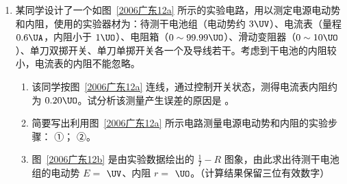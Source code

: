 \documentclass[\gkver]{gaokaozhenti}
\begin{document}
\begin{enumerate}
{figs/11b.png}

\begin{enumerate}
	\item
	实验前应对实验装置反复调节，直到 \tkanswer[3cm]{}。每次让小球从同一位置由静止释放，是为了 \tkanswer[4cm]{}。
	\item
	每次将 B 板向内侧平移距离 $d$，是为了 \tkanswer[5cm]{}。
	\item
	在图~\ref{2006广东11b} 中绘出小球做平抛运动的轨迹。
\end{enumerate}



\item
某同学设计了一个如图~\ref{2006广东12a} 所示的实验电路，用以测定电源电动势和内阻，使用的实验器材为：待测干电池组（电动势约 $3\UV$）、电流表（量程 $0.6\UA$，内阻小于 $1\UO$）、电阻箱（$0\sim99.99\UO$）、滑动变阻器（$0\sim10\UO$）、单刀双掷开关、单刀单掷开关各一个及导线若干。考虑到干电池的内阻较小，电流表的内阻不能忽略。


\begin{enumerate}
	\item
	该同学按图~\ref{2006广东12a} 连线，通过控制开关状态，测得电流表内阻约为 $0.20\UO$。试分析该测量产生误差的原因是 \tkanswer[5cm]{}。
	\item
	简要写出利用图~\ref{2006广东12a} 所示电路测量电源电动势和内阻的实验步骤：
	①\tkanswer[6cm]{}；
	②\tkanswer[6cm]{}。
	\item
	图~\ref{2006广东12b} 是由实验数据绘出的 $\frac{1}{I}-R$ 图象，由此求出待测干电池组的电动势 $E=$ \tkanswer[1.5cm]{}$\UV$、内阻 $r=$ \tkanswer[1.5cm]{}$\UO$。（计算结果保留三位有效数字）
\end{enumerate}


\end{enumerate}
\end{document}
